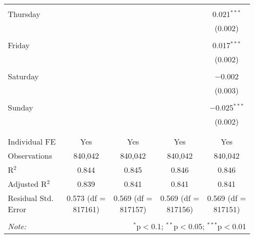 \documentclass[
]{article}
\begin{document}
\begin{table}[!htbp]
{\begin{tabular}{@{\extracolsep{5pt}}lcccc}
  & & & & \\ 
 Thursday &  &  &  & 0.021$^{***}$ \\ 
  &  &  &  & (0.002) \\ 
  & & & & \\ 
 Friday &  &  &  & 0.017$^{***}$ \\ 
  &  &  &  & (0.002) \\ 
  & & & & \\ 
 Saturday &  &  &  & $-$0.002 \\ 
  &  &  &  & (0.003) \\ 
  & & & & \\ 
 Sunday &  &  &  & $-$0.025$^{***}$ \\ 
  &  &  &  & (0.002) \\ 
  & & & & \\ 
\hline \\[-1.8ex] 
Individual FE & Yes & Yes & Yes & Yes \\ 
Observations & 840,042 & 840,042 & 840,042 & 840,042 \\ 
R$^{2}$ & 0.844 & 0.845 & 0.846 & 0.846 \\ 
Adjusted R$^{2}$ & 0.839 & 0.841 & 0.841 & 0.841 \\ 
Residual Std. Error & 0.573 (df = 817161) & 0.569 (df = 817157) & 0.569 (df = 817156) & 0.569 (df = 817151) \\ 
\hline 
\hline \\[-1.8ex] 
\textit{Note:}  & \multicolumn{4}{r}{$^{*}$p$<$0.1; $^{**}$p$<$0.05; $^{***}$p$<$0.01} \\ 
\end{tabular}
} 
\end{table} 
\newpage
\end{document}
